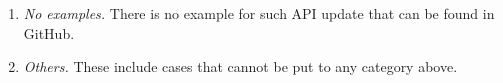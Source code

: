 \begin{enumerate}
\begin{itemize}
\end{itemize}

\item {\em No examples.} There is no example for such API update that can be found in GitHub. 

\item {\em Others.} These include cases that cannot be put to any category above.
\end{enumerate}